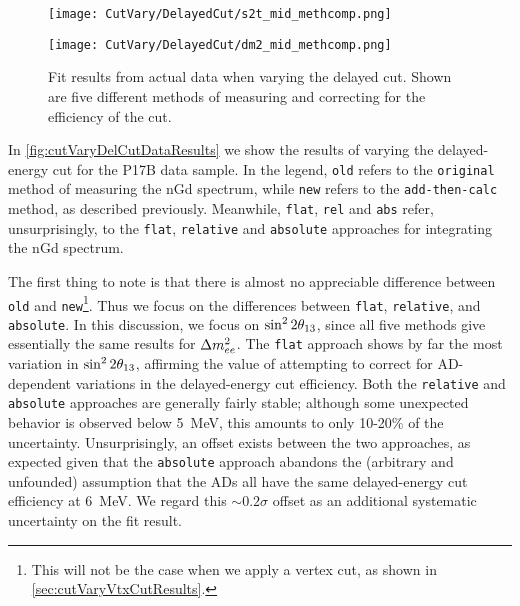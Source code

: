 \documentclass[../thesis.tex]{subfiles}
\begin{document}
\begin{figure}[ht]
  \begin{minipage}{0.5\linewidth}%
    \texttt{[image: CutVary/DelayedCut/s2t\_mid\_methcomp.png]}%
  \end{minipage}%
  \begin{minipage}{0.5\linewidth}%
    \texttt{[image: CutVary/DelayedCut/dm2\_mid\_methcomp.png]}%
  \end{minipage}%
  \caption{Fit results from actual data when varying the delayed cut. Shown are five different methods of measuring and correcting for the efficiency of the cut.}
  \label{fig:cutVaryDelCutDataResults}
\end{figure}

In \autoref{fig:cutVaryDelCutDataResults} we show the results of varying the delayed-energy cut for the P17B data sample. In the legend, \texttt{old} refers to the \texttt{original} method of measuring the nGd spectrum, while \texttt{new} refers to the \texttt{add-then-calc} method, as described previously. Meanwhile, \texttt{flat}, \texttt{rel} and \texttt{abs} refer, unsurprisingly, to the \texttt{flat}, \texttt{relative} and \texttt{absolute} approaches for integrating the nGd spectrum.

The first thing to note is that there is almost no appreciable difference between \texttt{old} and \texttt{new}\footnote{This will not be the case when we apply a vertex cut, as shown in \autoref{sec:cutVaryVtxCutResults}.}. Thus we focus on the differences between \texttt{flat}, \texttt{relative}, and \texttt{absolute}. In this discussion, we focus on $\sin^2 2\theta_{13}$, since all five methods give essentially the same results for $\Delta m^2_{ee}$. The \texttt{flat} approach shows by far the most variation in $\sin^2 2\theta_{13}$, affirming the value of attempting to correct for AD-dependent variations in the delayed-energy cut efficiency. Both the \texttt{relative} and \texttt{absolute} approaches are generally fairly stable; although some unexpected behavior is observed below 5~MeV, this amounts to only 10-20\% of the uncertainty. Unsurprisingly, an offset exists between the two approaches, as expected given that the \texttt{absolute} approach abandons the (arbitrary and unfounded) assumption that the ADs all have the same delayed-energy cut efficiency at 6~MeV. We regard this $\sim0.2\sigma$ offset as an additional systematic uncertainty on the fit result.%
\end{document}
